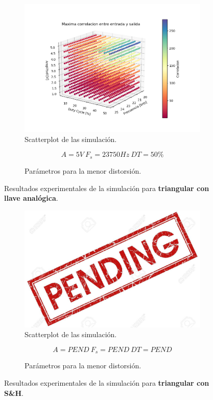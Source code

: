 \begin{figure}[H]
\centering
\begin{subfigure}{\linewidth}
\includegraphics[width=\linewidth]{ImagenesEjercicio6/scatter_llave_triang.png}
\caption{Scatterplot de las simulación.}
\end{subfigure}

\begin{subfigure}{\linewidth}
\[A = 5V \ F_s = 23750Hz \ DT = 50\%\]
\caption{Parámetros para la menor distorsión.}
\end{subfigure}
\label{triang_llave}
\caption{Resultados experimentales de la simulación para \textbf{triangular con llave analógica}.}
\end{figure}

\begin{figure}[H]
\centering
\begin{subfigure}{\linewidth}
\includegraphics[width=\linewidth]{ImagenesEjercicio6/pend.jpg}
\caption{Scatterplot de las simulación.}
\end{subfigure}

\begin{subfigure}{\linewidth}
\[A = PEND \ F_s = PEND \ DT = PEND\]
\caption{Parámetros para la menor distorsión.}
\end{subfigure}
\label{triang_sh}
\caption{Resultados experimentales de la simulación para \textbf{triangular con S\&H}.}
\end{figure}

